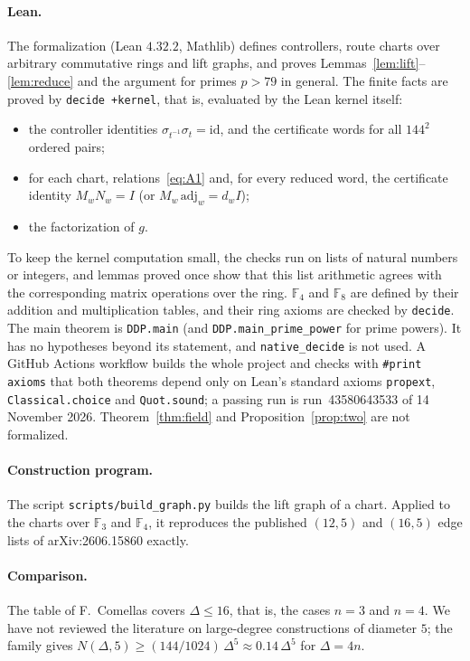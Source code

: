 \documentclass[11pt]{article}
\theoremstyle{definition}
\theoremstyle{remark}
\newcommand{\F}{\mathbb{F}}
\begin{document}
\paragraph{Lean.} The formalization (Lean $4.32.2$, Mathlib) defines
controllers, route charts over arbitrary commutative rings and lift graphs,
and proves Lemmas~\ref{lem:lift}--\ref{lem:reduce} and the argument for primes
$p>79$ in general. The finite facts are proved by \texttt{decide +kernel},
that is, evaluated by the Lean kernel itself:
\begin{itemize}
\item the controller identities $\sigma_{t^{-1}}\sigma_t=\mathrm{id}$, and the
certificate words for all $144^2$ ordered pairs;
\item for each chart, relations~\eqref{eq:A1} and, for every reduced word, the
certificate identity $M_wN_w=I$ (or $M_w\,\mathrm{adj}_w=d_wI$);
\item the factorization of $g$.
\end{itemize}
To keep the kernel computation small, the checks run on lists of
natural numbers or integers, and lemmas proved once show that this list
arithmetic agrees with the corresponding matrix operations over the ring.
$\F_4$ and $\F_8$ are defined by their addition and multiplication tables, and
their ring axioms are checked by \texttt{decide}. The main theorem is
\texttt{DDP.main} (and \texttt{DDP.main\_prime\_power} for prime powers). It has
no hypotheses beyond its statement, and \texttt{native\_decide} is not used.
A GitHub Actions workflow builds the whole project and checks with
\texttt{\#print axioms} that both theorems depend only on Lean's standard
axioms \texttt{propext}, \texttt{Classical.choice} and \texttt{Quot.sound};
a passing run is run~43580643533 of 14 November 2026. Theorem~\ref{thm:field} and
Proposition~\ref{prop:two} are not formalized.

\paragraph{Construction program.} The script \texttt{scripts/build\_graph.py}
builds the lift graph of a chart. Applied to the charts over $\F_3$ and $\F_4$,
it reproduces the published $(12,5)$ and $(16,5)$ edge lists of
arXiv:2606.15860 exactly.

\paragraph{Comparison.} The table of F.~Comellas covers $\Delta\le 16$, that
is, the cases $n=3$ and $n=4$. We have not reviewed the literature on
large-degree constructions of diameter $5$; the family gives
$N(\Delta,5)\ge (144/1024)\,\Delta^5\approx 0.14\,\Delta^5$ for $\Delta=4n$.
\end{document}
